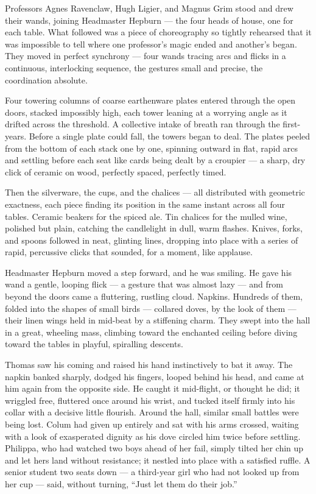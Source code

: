 Professors Agnes Ravenclaw, Hugh Ligier, and Magnus Grim stood and drew their wands, joining Headmaster Hepburn --- the four heads of house, one for each table. What followed was a piece of choreography so tightly rehearsed that it was impossible to tell where one professor's magic ended and another's began. They moved in perfect synchrony --- four wands tracing arcs and flicks in a continuous, interlocking sequence, the gestures small and precise, the coordination absolute.

Four towering columns of coarse earthenware plates entered through the open doors, stacked impossibly high, each tower leaning at a worrying angle as it drifted across the threshold. A collective intake of breath ran through the first-years. Before a single plate could fall, the towers began to deal. The plates peeled from the bottom of each stack one by one, spinning outward in flat, rapid arcs and settling before each seat like cards being dealt by a croupier --- a sharp, dry click of ceramic on wood, perfectly spaced, perfectly timed.

Then the silverware, the cups, and the chalices --- all distributed with geometric exactness, each piece finding its position in the same instant across all four tables. Ceramic beakers for the spiced ale. Tin chalices for the mulled wine, polished but plain, catching the candlelight in dull, warm flashes. Knives, forks, and spoons followed in neat, glinting lines, dropping into place with a series of rapid, percussive clicks that sounded, for a moment, like applause.

Headmaster Hepburn moved a step forward, and he was smiling. He gave his wand a gentle, looping flick --- a gesture that was almost lazy --- and from beyond the doors came a fluttering, rustling cloud. Napkins. Hundreds of them, folded into the shapes of small birds --- collared doves, by the look of them --- their linen wings held in mid-beat by a stiffening charm. They swept into the hall in a great, wheeling mass, climbing toward the enchanted ceiling before diving toward the tables in playful, spiralling descents.

Thomas saw his coming and raised his hand instinctively to bat it away. The napkin banked sharply, dodged his fingers, looped behind his head, and came at him again from the opposite side. He caught it mid-flight, or thought he did; it wriggled free, fluttered once around his wrist, and tucked itself firmly into his collar with a decisive little flourish. Around the hall, similar small battles were being lost. Colum had given up entirely and sat with his arms crossed, waiting with a look of exasperated dignity as his dove circled him twice before settling. Philippa, who had watched two boys ahead of her fail, simply tilted her chin up and let hers land without resistance; it nestled into place with a satisfied ruffle. A senior student two seats down --- a third-year girl who had not looked up from her cup --- said, without turning, \enquote{Just let them do their job.}

